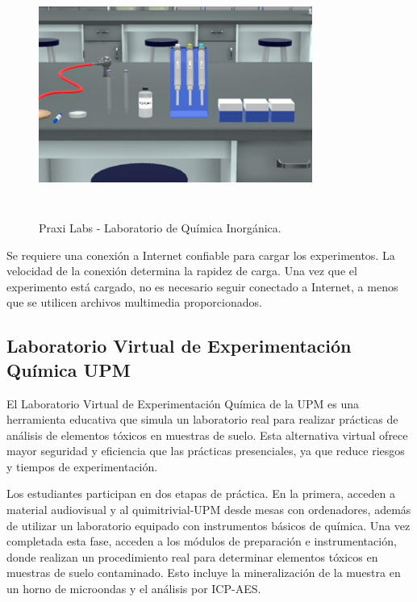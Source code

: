 \begin{figure}[thbp]
    \centering
    \includegraphics[width=0.8\textwidth, height=8cm]{img/chapter01/Praxi Labs.jpg}
    \caption{Praxi Labs - Laboratorio de Química Inorgánica.}\label{fig:Esquema}
\end{figure}

Se requiere una conexión a Internet confiable para cargar los experimentos. La velocidad de la conexión determina la rapidez de carga. Una vez que el experimento está cargado, no es necesario seguir conectado a Internet, a menos que se utilicen archivos multimedia proporcionados.

\newpage
\subsection{Laboratorio Virtual de Experimentación Química UPM}

El Laboratorio Virtual de Experimentación Química de la UPM es una herramienta educativa que simula un laboratorio real para realizar prácticas de análisis de elementos tóxicos en muestras de suelo. Esta alternativa virtual ofrece mayor seguridad y eficiencia que las prácticas presenciales, ya que reduce riesgos y tiempos de experimentación.

Los estudiantes participan en dos etapas de práctica. En la primera, acceden a material audiovisual y al quimitrivial-UPM desde mesas con ordenadores, además de utilizar un laboratorio equipado con instrumentos básicos de química. Una vez completada esta fase, acceden a los módulos de preparación e instrumentación, donde realizan un procedimiento real para determinar elementos tóxicos en muestras de suelo contaminado. Esto incluye la mineralización de la muestra en un horno de microondas y el análisis por ICP-AES.

